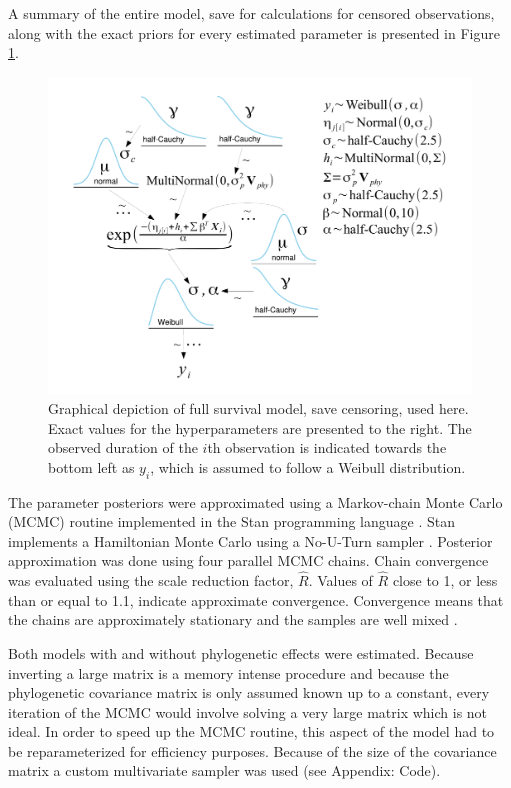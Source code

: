 \documentclass[12pt,letterpaper]{article}
\begin{document}
A summary of the entire model, save for calculations for censored observations, along with the exact priors for every estimated parameter is presented in Figure \ref{fig:model_diagram}.

\begin{figure}
  \centering
  \includegraphics[height = 0.5\textheight, width = \textwidth, keepaspectratio = true]{figure/mammal_survival_model}
  \caption{Graphical depiction of full survival model, save censoring, used here. Exact values for the hyperparameters are presented to the right. The observed duration of the \(i\)th observation is indicated towards the bottom left as \(y_{i}\), which is assumed to follow a Weibull distribution.}
  \label{fig:model_diagram}
\end{figure}


The parameter posteriors were approximated using a Markov-chain Monte Carlo (MCMC) routine implemented in the Stan programming language \citep{2014stan}. Stan implements a Hamiltonian Monte Carlo using a No-U-Turn sampler \citep{Hoffman-Gelman:2011}. Posterior approximation was done using four parallel MCMC chains. Chain convergence was evaluated using the scale reduction factor, \(\hat{R}\). Values of \(\hat{R}\) close to 1, or less than or equal to 1.1, indicate approximate convergence. Convergence means that the chains are approximately stationary and the samples are well mixed \citep{Gelman2013d}.

Both models with and without phylogenetic effects were estimated. Because inverting a large matrix is a memory intense procedure and because the phylogenetic covariance matrix is only assumed known up to a constant, every iteration of the MCMC would involve solving a very large matrix which is not ideal. In order to speed up the MCMC routine, this aspect of the model had to be reparameterized for efficiency purposes. Because of the size of the covariance matrix a custom multivariate sampler was used (see Appendix: Code).
\end{document}
